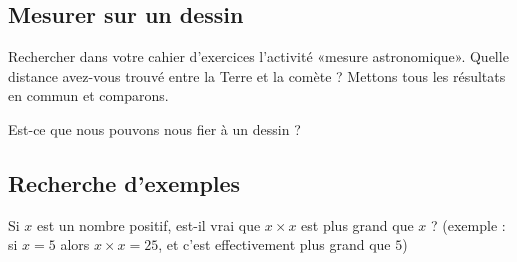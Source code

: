 
\subsection*{Mesurer sur un dessin}

Rechercher dans votre cahier d'exercices l'activité «mesure astronomique». Quelle distance avez-vous trouvé entre la Terre et la comète ? Mettons tous les résultats en commun et comparons.

Est-ce que nous pouvons nous fier à un dessin ?

\subsection*{Recherche d'exemples}

Si \( x\) est un nombre positif, est-il vrai que \( x\times x\) est plus grand que \( x\) ? (exemple : si \( x=5\) alors \( x\times x=25\), et c'est effectivement plus grand que \( 5\))
